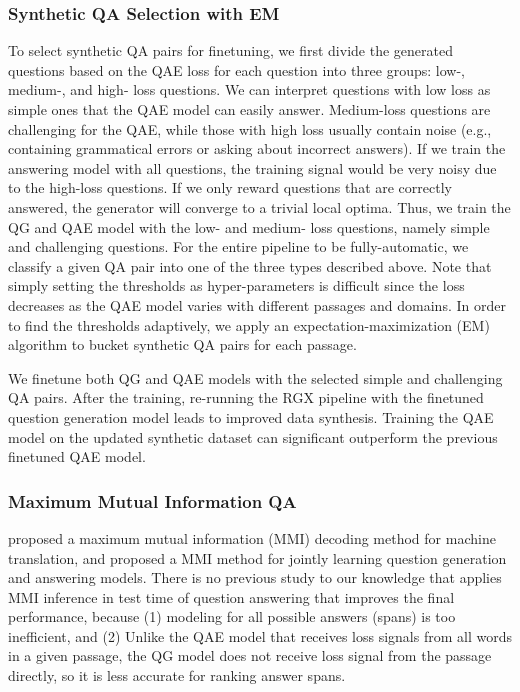 \documentclass[11pt,a4paper]{article}
\begin{document}
\subsubsection{Synthetic QA Selection with EM}
To select synthetic QA pairs for finetuning, we first divide the generated questions based on the QAE loss for each question into three groups: low-, medium-, and high- loss questions. We can interpret questions with low loss as simple ones that the QAE model can easily answer. Medium-loss questions are challenging for the QAE, while those with high loss usually contain noise (e.g., containing grammatical errors or asking about incorrect answers). If we train the answering model with all questions, the training signal would be very noisy due to the high-loss questions. If we only reward questions that are correctly answered, the generator will converge to a trivial local optima. Thus, we train the QG and QAE model with the low- and medium- loss questions, namely simple and challenging questions. For the entire pipeline to be fully-automatic, we classify a given QA pair into one of the three types described above. Note that simply setting the thresholds as hyper-parameters is difficult since the loss decreases as the QAE model varies with different passages and domains. In order to find the thresholds adaptively, we apply an expectation-maximization (EM) algorithm to bucket synthetic QA pairs for each passage.

We finetune both QG and QAE models with the selected simple and challenging QA pairs. After the training, re-running the RGX pipeline with the finetuned question generation model leads to improved data synthesis. Training the QAE model on the updated synthetic dataset can significant outperform the previous finetuned QAE model.

\subsubsection{Maximum Mutual Information QA}
\citet{li2016mutual} proposed a maximum mutual information (MMI) decoding method for machine translation, and \citet{tang2017question} proposed a MMI method for jointly learning question generation and answering models. There is no previous study to our knowledge that applies MMI inference in test time of question answering that improves the final performance, because (1) modeling  for all possible answers (spans)  is too inefficient, and (2) Unlike the QAE model that receives loss signals from all words in a given passage, the QG model does not receive loss signal from the passage directly, so  it is less accurate for ranking answer spans.
\end{document}
